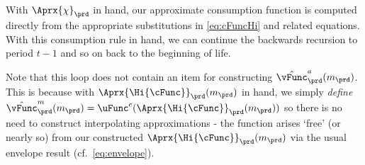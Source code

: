 With $\Aprx{\chi}_{\prd}$ in hand, our approximate consumption function
is computed directly from the appropriate substitutions in \eqref{eq:cFuncHi}
and related equations.  With this consumption
rule in hand, we can continue the backwards recursion to period $t-1$
and so on back to the beginning of life.

Note that this loop does not contain an item for constructing $\hat{\vFunc}_{\prd}^{a}(m_{\prd})$. This is because with $\Aprx{\Hi{\cFunc}}_{\prd}(m_{\prd})$ in hand, we simply \textit{define} $\hat{\vFunc}^{m}_{\prd}(m_{\prd}) = \uFunc^{c}(\Aprx{\Hi{\cFunc}}_{\prd}(m_{\prd}))$ so there is no need to construct interpolating approximations - the function arises `free' (or nearly so) from our constructed $\Aprx{\Hi{\cFunc}}_{\prd}(m_{\prd})$ via the usual envelope result (cf.\ \eqref{eq:envelope}).


